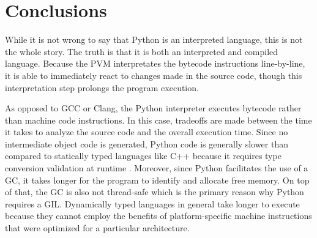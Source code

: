 \section{Conclusions}

While it is not wrong to say that Python is an interpreted language, this is not
the whole story. The truth is that it is both an interpreted and compiled language.
Because the PVM interpretates the bytecode instructions line-by-line, it is able
to immediately react to changes made in the source code, though this interpretation
step prolongs the program execution.

As opposed to GCC or Clang, the Python interpreter executes bytecode rather than
machine code instructions. In this case, tradeoffs are made between the time it
takes to analyze the source code and the overall execution time. Since no intermediate
object code is generated, Python code is generally slower than compared to statically
typed languages like C++ because it requires type conversion validation at runtime
\autocite{zehra2020}. Moreover, since Python facilitates the use of a GC, it takes
longer for the program to identify and allocate free memory. On top of that, the
GC is also not thread-safe which is the primary reason why Python requires a GIL.
Dynamically typed languages in general take longer to execute because they cannot
employ the benefits of platform-specific machine instructions that were optimized
for a particular architecture. 
